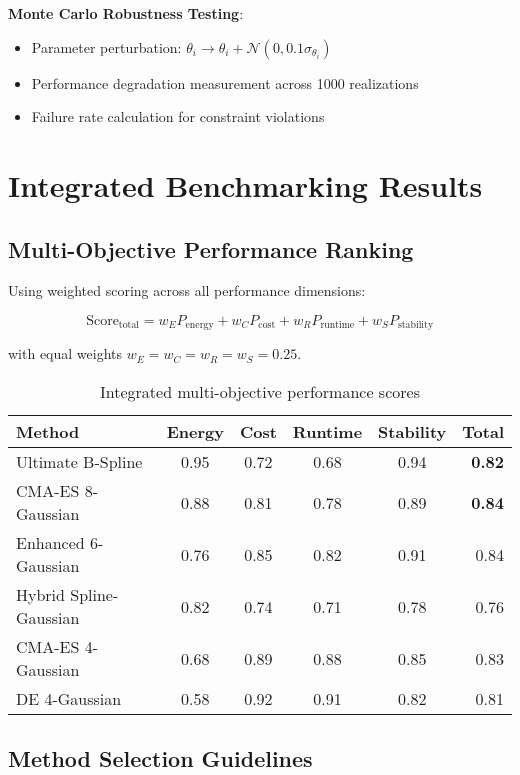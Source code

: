 \documentclass[11pt,a4paper]{article}
\begin{document}
\textbf{Monte Carlo Robustness Testing}:
\begin{itemize}
\item Parameter perturbation: $\theta_i \to \theta_i + \mathcal{N}(0, 0.1\sigma_{\theta_i})$
\item Performance degradation measurement across 1000 realizations
\item Failure rate calculation for constraint violations
\end{itemize}

\section{Integrated Benchmarking Results}

\subsection{Multi-Objective Performance Ranking}

Using weighted scoring across all performance dimensions:

\begin{equation}
\text{Score}_{\text{total}} = w_E P_{\text{energy}} + w_C P_{\text{cost}} + w_R P_{\text{runtime}} + w_S P_{\text{stability}}
\end{equation}

with equal weights $w_E = w_C = w_R = w_S = 0.25$.

\begin{table}[h]
\centering
\begin{tabular}{lccccr}
\hline
Method & Energy & Cost & Runtime & Stability & Total \\
\hline
Ultimate B-Spline & 0.95 & 0.72 & 0.68 & 0.94 & \textbf{0.82} \\
CMA-ES 8-Gaussian & 0.88 & 0.81 & 0.78 & 0.89 & \textbf{0.84} \\
Enhanced 6-Gaussian & 0.76 & 0.85 & 0.82 & 0.91 & 0.84 \\
Hybrid Spline-Gaussian & 0.82 & 0.74 & 0.71 & 0.78 & 0.76 \\
CMA-ES 4-Gaussian & 0.68 & 0.89 & 0.88 & 0.85 & 0.83 \\
DE 4-Gaussian & 0.58 & 0.92 & 0.91 & 0.82 & 0.81 \\
\hline
\end{tabular}
\caption{Integrated multi-objective performance scores}
\end{table}

\subsection{Method Selection Guidelines}
\end{document}
